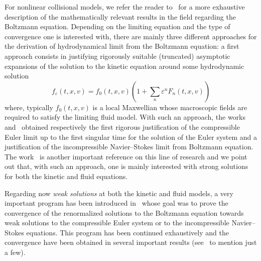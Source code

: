 \documentclass[10pt]{amsart}
\theoremstyle{definition}\newtheorem{defi}[theo]{Definition}\newtheorem{rema}[theo]{Remark}\newtheorem{exam}[theo]{Example}\newtheorem{exem}[theo]{Example}\newtheorem{nota}[theo]{Notation}
\newcommand*\eps{{\varepsilon}}
\begin{document}
For nonlinear collisional models, we refer the reader to~\cite{golse,SR} for a more exhaustive description of the mathematically relevant results in the field regarding the Boltzmann equation. Depending on the limiting equation and the type of convergence one is interested with, there are mainly three different approaches for the derivation of hydrodynamical limit from the Boltzmann equation: a first approach consists in justifying rigorously suitable (truncated) asymptotic expansions of the solution to the kinetic equation around some hydrodynamic solution
\begin{equation*}\label{eq:C-E}
f_{\eps}(t,x,v)=f_{0}(t,x,v)\left(1+\sum_{n}\eps^{n}F_{n}(t,x,v)\right)
\end{equation*}
where, typically $f_{0}(t,x,v)$ is a local Maxwellian whose macroscopic fields are required to satisfy the limiting fluid model. With such an approach, the works~\cite{caflisch} and~\cite{demasi} obtained respectively the first rigorous justification of the compressible Euler limit up to the first singular time for the solution of the Euler system and a justification of the incompressible Navier--Stokes limit from Boltzmann equation. The work~\cite{G2006} is another important reference on this line of research and we point out that, with such an approach, one is mainly interested with strong solutions for both the kinetic and fluid equations.

Regarding now \emph{weak solutions} at both the kinetic and fluid models, a very important program has been introduced in~\cite{BaGoLe1,BaGoLe2} whose goal was to prove the convergence of the renormalized solutions to the Boltzmann equation towards weak solutions to the compressible Euler system or to the incompressible Navier--Stokes equations. This program has been continued exhaustively and the convergence have been obtained in several important results (see~\cite{golseSR,golseSR1,jiang-masm,lever,lions-masm1,lions-masm2} to mention just a few).
\end{document}
